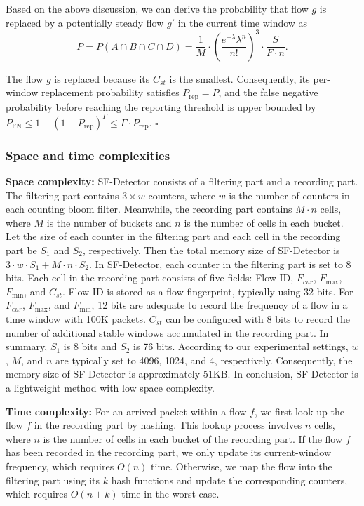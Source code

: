 \documentclass[preprint,12pt]{elsarticle}
\begin{document}
Based on the above discussion, we can derive the probability that flow $g$ is replaced by a potentially steady flow $g'$ in the current time window as
\begin{equation}
    P = P(A \cap B \cap C \cap D) = \frac{1}{M} \cdot \left(\frac{e^{-\lambda} \lambda^n}{n!}\right)^3 \cdot \frac{S}{F \cdot n}.
\end{equation}

The flow $g$ is replaced because its $C_{st}$ is the smallest. Consequently, its per-window replacement probability satisfies $P_{\mathrm{rep}} = P$, and the false negative probability before reaching the reporting threshold is upper bounded by $P_{\mathrm{FN}} \le 1 - (1 - P_{\mathrm{rep}})^{\Gamma} \le \Gamma \cdot P_{\mathrm{rep}}$.
\hfill $\square$

\subsubsection{Space and time complexities}

\textbf{Space complexity:} SF-Detector consists of a filtering part and a recording part. The filtering part contains $3 \times w$ counters, where $w$ is the number of counters in each counting bloom filter. Meanwhile, the recording part contains $M \cdot n$ cells, where $M$ is the number of buckets and $n$ is the number of cells in each bucket. Let the size of each counter in the filtering part and each cell in the recording part be $S_1$ and $S_2$, respectively. Then the total memory size of SF-Detector is $3 \cdot w \cdot S_1 + M \cdot n \cdot S_2$. In SF-Detector, each counter in the filtering part is set to 8 bits. Each cell in the recording part consists of five fields: Flow ID, $F_{cur}$, $F_{\max}$, $F_{\min}$, and $C_{st}$. Flow ID is stored as a flow fingerprint, typically using 32 bits. For $F_{cur}$, $F_{\max}$, and $F_{\min}$, 12 bits are adequate to record the frequency of a flow in a time window with 100K packets. $C_{st}$ can be configured with 8 bits to record the number of additional stable windows accumulated in the recording part. In summary, $S_1$ is 8 bits and $S_2$ is 76 bits. According to our experimental settings, $w$, $M$, and $n$ are typically set to 4096, 1024, and 4, respectively. Consequently, the memory size of SF-Detector is approximately 51KB. In conclusion, SF-Detector is a lightweight method with low space complexity.

\textbf{Time complexity:} For an arrived packet within a flow $f$, we first look up the flow $f$ in the recording part by hashing. This lookup process involves $n$ cells, where $n$ is the number of cells in each bucket of the recording part. If the flow $f$ has been recorded in the recording part, we only update its current-window frequency, which requires $O(n)$ time. Otherwise, we map the flow into the filtering part using its $k$ hash functions and update the corresponding counters, which requires $O(n + k)$ time in the worst case.
\end{document}

